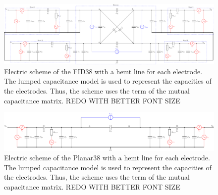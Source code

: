 \begin{landscape}

\begin{figure}
\centering
\includegraphics[width=\linewidth]{Figures/Electrodes/scheme_fid38_fat.png}
\caption{Electric scheme of the FID38 with a hemt line for each electrode. The lumped capacitance model is used to represent the capacities of the electrodes. Thus, the scheme uses the term of the mutual capacitance matrix. REDO WITH BETTER FONT SIZE}
\label{fig:lumped-capacitance}
\end{figure}

\begin{figure}
\centering
\includegraphics[width=\linewidth]{Figures/Electrodes/scheme_planar38.png}
\caption{Electric scheme of the Planar38 with a hemt line for each electrode. The lumped capacitance model is used to represent the capacities of the electrodes. Thus, the scheme uses the term of the mutual capacitance matrix. REDO WITH BETTER FONT SIZE}
\label{fig:lumped-capacitance}
\end{figure}

\end{landscape}

